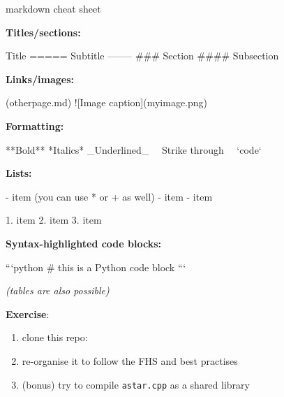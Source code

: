 \documentclass[compress]{beamer}
\begin{document}
\begin{frame}[fragile]{markdown cheat sheet}
\scriptsize

\begin{multicols}{2}

{\bf Titles/sections:}

\begin{mdcode}
Title
=====
Subtitle
--------
### Section
#### Subsection
\end{mdcode}

{\bf Links/images:}

\begin{mdcode}
(otherpage.md)
![Image caption](myimage.png)
\end{mdcode}

{\bf Formatting:}

\begin{mdcode}
**Bold**
*Italics*
_Underlined_
~~Strike through~~
`code`
\end{mdcode}

{\bf Lists:}

\begin{mdcode}
- item (you can use * or + as well)
- item
- item

1. item
2. item
3. item
\end{mdcode}

{\bf Syntax-highlighted code blocks:}

\begin{mdcode}
```python
    # this is a Python code block
```
\end{mdcode}

\emph{(tables are also possible)}
\end{multicols}

\end{frame}

\begin{frame}[plain]{}
    \begin{center}
        \Large
        {\bf Exercise}: 
        \begin{enumerate}
            \item clone this repo: 
            \item re-organise it to follow the FHS and best practises
            \item (bonus) try to compile {\tt astar.cpp} as a shared library
        \end{enumerate}
    \end{center}

\end{frame}
\end{document}
